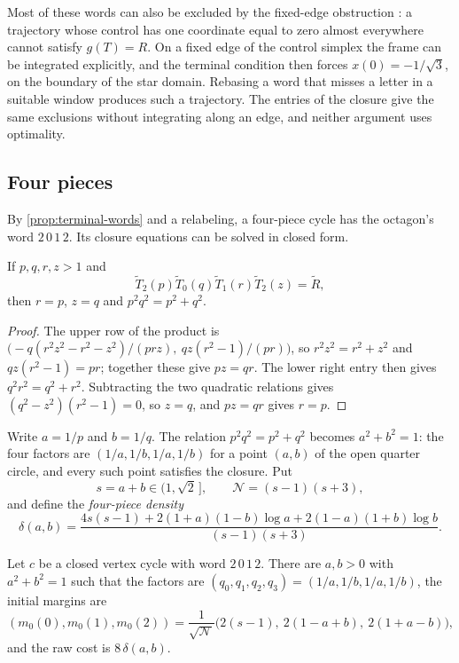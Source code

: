\begin{remark}\label{rem:terminal-words-route}
Most of these words can also be excluded by the fixed-edge obstruction \cite{Notes}: a trajectory
whose control has one coordinate equal to zero almost everywhere cannot satisfy $g(T)=R$. On a
fixed edge of the control simplex the frame can be integrated explicitly, and the terminal
condition then forces $x(0)=-1/\sqrt3$, on the boundary of the star domain. Rebasing a word that
misses a letter in a suitable window produces such a trajectory. The entries of the closure give
the same exclusions without integrating along an edge, and neither argument uses optimality.
\end{remark}

\subsection{Four pieces}\label{sec:terminal-four}

By \cref{prop:terminal-words} and a relabeling, a four-piece cycle has the octagon's word
$2\,0\,1\,2$. Its closure equations can be solved in closed form.

\begin{lemma}\label{lem:four-closure}
If $p,q,r,z>1$ and
\[\widetilde T_2(p)\widetilde T_0(q)\widetilde T_1(r)\widetilde T_2(z)=\widetilde R,\]
then $r=p$,
$z=q$ and $p^2q^2=p^2+q^2$.
\end{lemma}

\begin{proof}
The upper row of the product is
$\bigl(-q(r^2z^2-r^2-z^2)/(prz),\ qz(r^2-1)/(pr)\bigr)$, so $r^2z^2=r^2+z^2$ and
$qz(r^2-1)=pr$; together these give $pz=qr$. The lower right entry then gives
$q^2r^2=q^2+r^2$. Subtracting the two quadratic relations gives $(q^2-z^2)(r^2-1)=0$, so $z=q$,
and $pz=qr$ gives $r=p$.
\end{proof}

Write $a=1/p$ and $b=1/q$. The relation $p^2q^2=p^2+q^2$ becomes $a^2+b^2=1$: the four factors
are $(1/a,1/b,1/a,1/b)$ for a point $(a,b)$ of the open quarter circle, and every such point
satisfies the closure. Put
\[
 s=a+b\in(1,\sqrt2\,],\qquad \mathcal N=(s-1)(s+3),
\]
and define the \emph{four-piece density}
\begin{equation}\label{eq:four-density}
 \delta(a,b)=\frac{4s(s-1)+2(1+a)(1-b)\log a+2(1-a)(1+b)\log b}{(s-1)(s+3)}.
\end{equation}

\begin{lemma}\label{lem:four-param}
Let $c$ be a closed vertex cycle with word $2\,0\,1\,2$. There are $a,b>0$ with $a^2+b^2=1$
such that the factors are $(q_0,q_1,q_2,q_3)=(1/a,1/b,1/a,1/b)$, the initial margins are
\begin{equation}\label{eq:four-margins}
 (m_0(0),m_0(1),m_0(2))=\frac{1}{\sqrt{\mathcal N}}\bigl(2(s-1),\ 2(1-a+b),\ 2(1+a-b)\bigr),
\end{equation}
and the raw cost is $8\,\delta(a,b)$.
\end{lemma}

